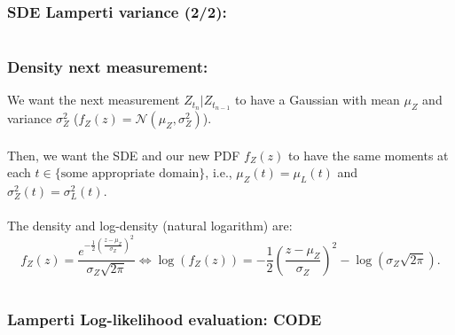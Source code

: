 \documentclass[aspectratio=169]{beamer}\usepackage[utf8]{inputenc}
\begin{document}
\begin{frame}\frametitle{SDE Lamperti variance (2/2):}

\begin{center}
\begin{tabular}{|c|}
\toprule
{\tiny

}\\
\bottomrule
\end{tabular}
\end{center}

\end{frame}


\begin{frame}\frametitle{Density next measurement:}

We want the next measurement $Z_{t_n}|Z_{t_{n-1}}$ to have a Gaussian with mean $\mu_Z$ and variance $\sigma_Z^2$ ($f_Z(z)=\mathcal{N}(\mu_Z,\sigma^2_Z)$).\\
\quad\\
Then, we want the SDE and our new PDF $f_Z(z)$ to have the same moments at each $t\in\{\text{some appropriate domain}\}$, i.e., $\mu_Z(t)=\mu_L(t)$ and $\sigma^2_Z(t)=\sigma^2_L(t)$.\\
\quad\\
The density and log-density (natural logarithm) are:
\begin{equation*}
f_Z(z)=\frac{e^{-\frac{1}{2}\left(\frac{z-\mu_Z}{\sigma_Z}\right)^2}}{\sigma_Z\sqrt{2\pi}}\iff \log(f_Z(z))=-\frac{1}{2}\left(\frac{z-\mu_Z}{\sigma_Z}\right)^2-\log(\sigma_Z\sqrt{2\pi}).
\end{equation*}

\begin{center}
\begin{tabular}{|c|}
\toprule
{\tiny

}\\
\bottomrule
\end{tabular}
\end{center}

\end{frame}


\begin{frame}\frametitle{Lamperti Log-likelihood evaluation: CODE}

\begin{center}
\begin{tabular}{|c|}
\toprule
{\tiny

}\\
\bottomrule
\end{tabular}
\end{center}

\end{frame}
\end{document}

